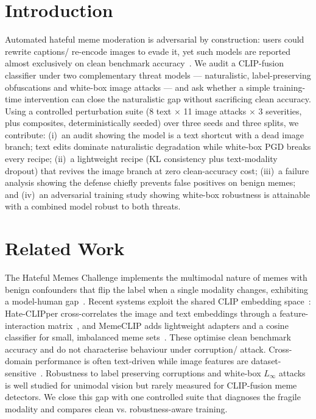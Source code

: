\documentclass{article}
\begin{document}
\section{Introduction}
\label{sec:intro}

Automated hateful meme moderation is adversarial by construction: users could rewrite captions/ re-encode images to evade
it, yet such models are reported almost exclusively on clean benchmark
accuracy~\cite{kiela2020hatefulmemes,kumar2022hateclipper}. We audit a
CLIP-fusion classifier under two complementary threat models --- naturalistic,
label-preserving obfuscations and white-box image attacks --- and ask whether a
simple training-time intervention can close the naturalistic gap without
sacrificing clean accuracy. Using a controlled perturbation suite (8 text $\times$
11 image attacks $\times$ 3 severities, plus composites, deterministically
seeded) over three seeds and three splits, we contribute: (i)~an audit showing
the model is a text shortcut with a dead image branch; text edits
dominate naturalistic degradation while white-box PGD breaks every recipe;
(ii)~a lightweight recipe (KL consistency plus text-modality dropout) that
revives the image branch at zero clean-accuracy cost; (iii)~a failure
analysis showing the defense chiefly prevents false positives on benign
memes; and (iv)~an adversarial training study showing white-box robustness is
attainable with a combined model robust to both threats.

\section{Related Work}
\label{sec:related_work}

The Hateful Memes Challenge implements the multimodal nature of memes with benign confounders that flip the label when a single modality changes, exhibiting a model-human gap~\cite{kiela2020hatefulmemes}. Recent systems exploit the shared CLIP
embedding space~\cite{radford2021clip}: Hate-CLIPper cross-correlates the image
and text embeddings through a feature-interaction
matrix~\cite{kumar2022hateclipper}, and MemeCLIP adds lightweight adapters and a
cosine classifier for small, imbalanced meme sets~\cite{shah2024memeclip}. These
optimise clean benchmark accuracy and do not characterise behaviour under
corruption/ attack. Cross-domain performance is often text-driven while image features are
dataset-sensitive~\cite{aggarwal2024textimage}. Robustness to label preserving
corruptions and white-box $L_\infty$
attacks~\cite{goodfellow2015explaining,madry2018towards,zhang2019theoretically} is
well studied for unimodal vision but rarely measured for CLIP-fusion meme
detectors. We close this gap with one controlled suite that diagnoses the fragile
modality and compares clean vs. robustness-aware training.
\end{document}
